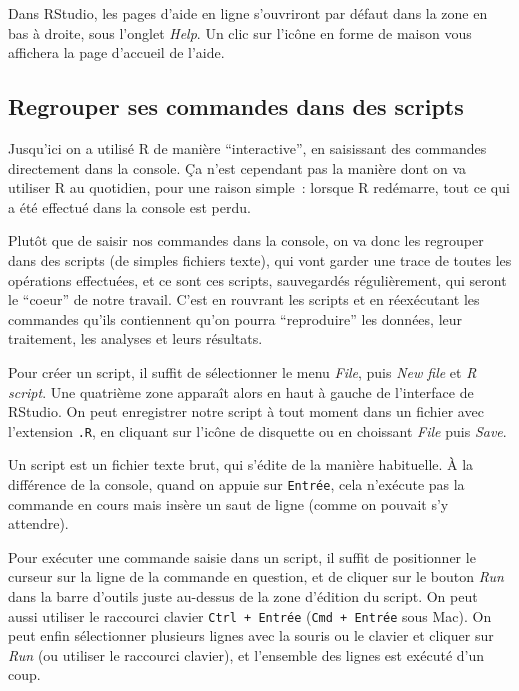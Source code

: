 \documentclass[
  12pt,
]{book}
\begin{document}
Dans RStudio, les pages d'aide en ligne s'ouvriront par défaut dans la zone en bas à droite,
sous l'onglet \emph{Help}. Un clic sur l'icône en forme de maison vous affichera la page d'accueil de l'aide.

\hypertarget{regrouper-ses-commandes-dans-des-scripts}{%
\subsection{Regrouper ses commandes dans des scripts}\label{regrouper-ses-commandes-dans-des-scripts}}

Jusqu'ici on a utilisé R de manière ``interactive'', en saisissant des commandes directement dans la console. Ça n'est cependant pas la manière dont on va utiliser R au quotidien, pour une raison simple~: lorsque R redémarre, tout ce qui a été effectué dans la console est perdu.

Plutôt que de saisir nos commandes dans la console, on va donc les regrouper dans des scripts (de simples fichiers texte), qui vont garder une trace de toutes les opérations effectuées, et ce sont ces scripts, sauvegardés régulièrement, qui seront le ``coeur'' de notre travail. C'est en rouvrant les scripts et en réexécutant les commandes qu'ils contiennent qu'on pourra ``reproduire'' les données, leur traitement, les analyses et leurs résultats.

Pour créer un script, il suffit de sélectionner le menu \emph{File}, puis \emph{New file} et \emph{R script}. Une quatrième zone apparaît alors en haut à gauche de l'interface de RStudio. On peut enregistrer notre script à tout moment dans un fichier avec l'extension \texttt{.R}, en cliquant sur l'icône de disquette ou en choissant \emph{File} puis \emph{Save}.

Un script est un fichier texte brut, qui s'édite de la manière habituelle. À la différence de la console, quand on appuie sur \texttt{Entrée}, cela n'exécute pas la commande en cours mais insère un saut de ligne (comme on pouvait s'y attendre).

Pour exécuter une commande saisie dans un script, il suffit de positionner le curseur sur la ligne de la commande en question, et de cliquer sur le bouton \emph{Run} dans la barre d'outils juste au-dessus de la zone d'édition du script. On peut aussi utiliser le raccourci clavier \texttt{Ctrl\ +\ Entrée} (\texttt{Cmd\ +\ Entrée} sous Mac). On peut enfin sélectionner plusieurs lignes avec la souris ou le clavier et cliquer sur \emph{Run} (ou utiliser le raccourci clavier), et l'ensemble des lignes est exécuté d'un coup.
\end{document}
